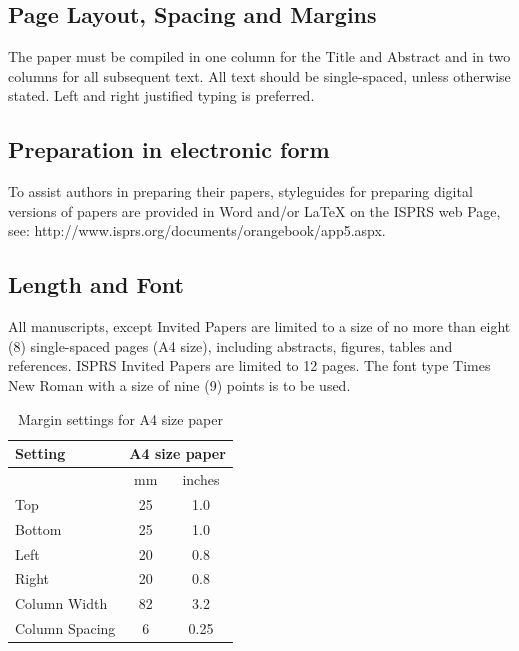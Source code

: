 \documentclass{isprs} %
\begin{document}
\subsection{Page Layout, Spacing and Margins}\label{sec:Page Layout, Spacing and Margins}

The paper must be compiled in one column for the Title and Abstract and in two columns for all subsequent text. 
All text should be single-spaced, unless otherwise stated. Left and right justified typing is preferred.


\subsection{Preparation in electronic form}\label{sec:Preparation in electronic form}

To assist authors in preparing their papers, styleguides for preparing digital versions of papers are 
provided in Word and/or LaTeX on the ISPRS web Page, see: http://www.isprs.org/documents/orangebook/app5.aspx.



\subsection{Length and Font}\label{sec:Length and Font}

All manuscripts, except Invited Papers are limited to a size of no more than eight (8) single-spaced 
pages (A4 size), including abstracts, figures, tables and references. ISPRS Invited Papers are limited 
to 12 pages. The font type Times New Roman with a size of nine (9) points is to be used.

\begin{table}[h]
	\centering
		\begin{tabular}{|l|c|c|}\hline
			Setting&\multicolumn{2}{c|}{A4 size paper}\\\hline
			  &mm&inches\\
			 Top&25&1.0\\
			 Bottom&25&1.0\\
			 Left&20&0.8\\
			 Right&20&0.8\\
			 Column Width&82&3.2\\
			 Column Spacing&6&0.25\\\hline
		\end{tabular}
	\caption{Margin settings for A4 size paper}
\label{tab:Margin_settings}
\end{table}
\end{document}
